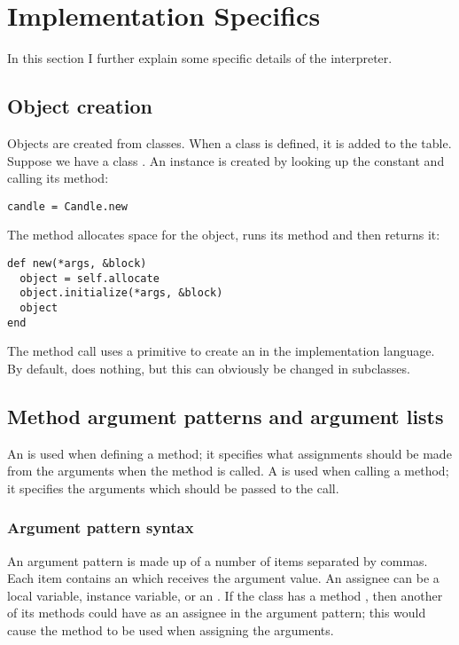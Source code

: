 \section{Implementation Specifics}
\label{sec:implementation_specifics}

In this section I further explain some specific details of the interpreter.

\subsection{Object creation}

Objects are created from classes. When a class is defined, it is added to the  table. Suppose we have a class . An instance is created by looking up the  constant and calling its  method:

\begin{lstlisting}
candle = Candle.new
\end{lstlisting}

The  method allocates space for the object, runs its  method and then returns it:

\begin{lstlisting}
def new(*args, &block)
  object = self.allocate
  object.initialize(*args, &block)
  object
end
\end{lstlisting}

The  method call uses a primitive to create an  in the implementation language. By default,  does nothing, but this can obviously be changed in subclasses.

\subsection{Method argument patterns and argument lists}
\label{sec:arguments}

An  is used when defining a method; it specifies what assignments should be made from the arguments when the method is called. A  is used when calling a method; it specifies the arguments which should be passed to the call.

\subsubsection{Argument pattern syntax}

An argument pattern is made up of a number of items separated by commas. Each item contains an  which receives the argument value. An assignee can be a local variable, instance variable, or an . If the class has a method , then another of its methods could have  as an assignee in the argument pattern; this would cause the  method to be used when assigning the arguments.

